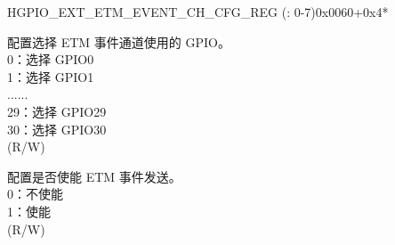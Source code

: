 \begin{register}{H}{GPIO\_EXT\_ETM\_EVENT\_CH\_CFG\_REG (: 0-7)}{0x0060+0x4*}\label{regdesc:GPIOSDETMEVENTCHNCFGREG}
%
%
%
%
\regnewline%
\begin{regdesc}\begin{reglist}
\label{fielddesc:GPIOSDETMCH0EVENTSEL}\item [GPIO\_EXT\_ETM\_CH\regindex{n}\_EVENT\_SEL] 配置选择 ETM 事件通道使用的 GPIO。\\
0：选择 GPIO0\\
1：选择 GPIO1\\
......\\
29：选择 GPIO29\\
30：选择 GPIO30\\ (R/W)
\label{fielddesc:GPIOSDETMCH0EVENTEN}\item [GPIO\_EXT\_ETM\_CH\regindex{n}\_EVENT\_EN] 配置是否使能 ETM 事件发送。\\
0：不使能\\
1：使能\\(R/W)
\end{reglist}\end{regdesc}
\end{register}


